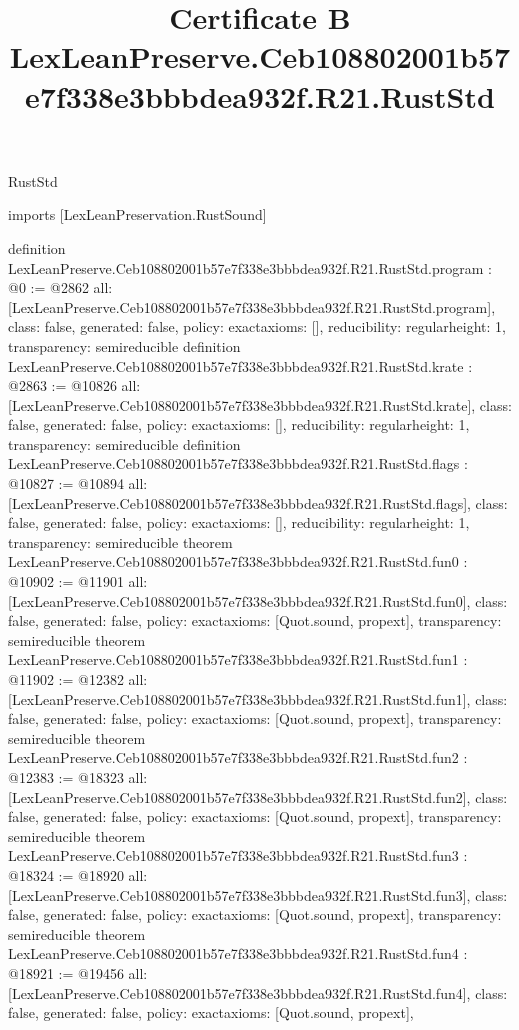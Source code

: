 \begin{lexlean}{RustStd}
\title{Certificate B LexLeanPreserve.Ceb108802001b57e7f338e3bbbdea932f.R21.RustStd}
\begin{coremodule}
imports [LexLeanPreservation.RustSound]

definition LexLeanPreserve.Ceb108802001b57e7f338e3bbbdea932f.R21.RustStd.program : @0 := @2862 {
  all: [LexLeanPreserve.Ceb108802001b57e7f338e3bbbdea932f.R21.RustStd.program],
  class: false,
  generated: false,
  policy: exact{axioms: []},
  reducibility: regular{height: 1},
  transparency: semireducible
}
definition LexLeanPreserve.Ceb108802001b57e7f338e3bbbdea932f.R21.RustStd.krate : @2863 := @10826 {
  all: [LexLeanPreserve.Ceb108802001b57e7f338e3bbbdea932f.R21.RustStd.krate],
  class: false,
  generated: false,
  policy: exact{axioms: []},
  reducibility: regular{height: 1},
  transparency: semireducible
}
definition LexLeanPreserve.Ceb108802001b57e7f338e3bbbdea932f.R21.RustStd.flags : @10827 := @10894 {
  all: [LexLeanPreserve.Ceb108802001b57e7f338e3bbbdea932f.R21.RustStd.flags],
  class: false,
  generated: false,
  policy: exact{axioms: []},
  reducibility: regular{height: 1},
  transparency: semireducible
}
theorem LexLeanPreserve.Ceb108802001b57e7f338e3bbbdea932f.R21.RustStd.fun0 : @10902 := @11901 {
  all: [LexLeanPreserve.Ceb108802001b57e7f338e3bbbdea932f.R21.RustStd.fun0],
  class: false,
  generated: false,
  policy: exact{axioms: [Quot.sound, propext]},
  transparency: semireducible
}
theorem LexLeanPreserve.Ceb108802001b57e7f338e3bbbdea932f.R21.RustStd.fun1 : @11902 := @12382 {
  all: [LexLeanPreserve.Ceb108802001b57e7f338e3bbbdea932f.R21.RustStd.fun1],
  class: false,
  generated: false,
  policy: exact{axioms: [Quot.sound, propext]},
  transparency: semireducible
}
theorem LexLeanPreserve.Ceb108802001b57e7f338e3bbbdea932f.R21.RustStd.fun2 : @12383 := @18323 {
  all: [LexLeanPreserve.Ceb108802001b57e7f338e3bbbdea932f.R21.RustStd.fun2],
  class: false,
  generated: false,
  policy: exact{axioms: [Quot.sound, propext]},
  transparency: semireducible
}
theorem LexLeanPreserve.Ceb108802001b57e7f338e3bbbdea932f.R21.RustStd.fun3 : @18324 := @18920 {
  all: [LexLeanPreserve.Ceb108802001b57e7f338e3bbbdea932f.R21.RustStd.fun3],
  class: false,
  generated: false,
  policy: exact{axioms: [Quot.sound, propext]},
  transparency: semireducible
}
theorem LexLeanPreserve.Ceb108802001b57e7f338e3bbbdea932f.R21.RustStd.fun4 : @18921 := @19456 {
  all: [LexLeanPreserve.Ceb108802001b57e7f338e3bbbdea932f.R21.RustStd.fun4],
  class: false,
  generated: false,
  policy: exact{axioms: [Quot.sound, propext]},
}
\end{coremodule}
\end{lexlean}
